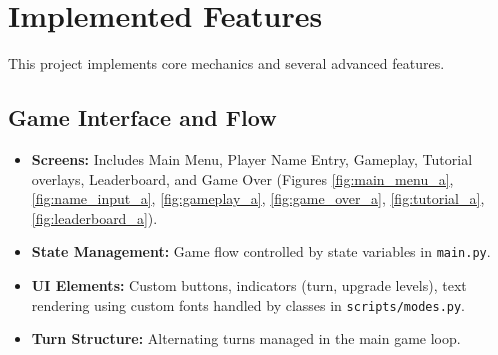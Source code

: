 \documentclass[11pt, a4paper]{article}
\begin{document}
\section{Implemented Features}

This project implements core mechanics and several advanced features.

\subsection{Game Interface and Flow}

\begin{itemize}

    \item \textbf{Screens:} Includes Main Menu, Player Name Entry, Gameplay, Tutorial overlays, Leaderboard, and Game Over (Figures \ref{fig:main_menu_a}, \ref{fig:name_input_a}, \ref{fig:gameplay_a}, \ref{fig:game_over_a}, \ref{fig:tutorial_a}, \ref{fig:leaderboard_a}).
    
    \item \textbf{State Management:} Game flow controlled by state variables in \texttt{main.py}.
    
    \item \textbf{UI Elements:} Custom buttons, indicators (turn, upgrade levels), text rendering using custom fonts handled by classes in \texttt{scripts/modes.py}.
    
    \item \textbf{Turn Structure:} Alternating turns managed in the main game loop.

\end{itemize}
\end{document}
